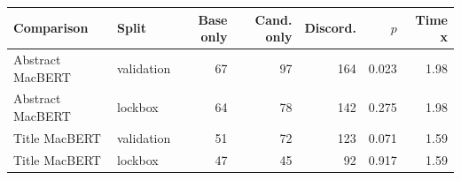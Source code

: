 \small
\setlength{\tabcolsep}{3.5pt}
\begin{tabular}{@{}llrrrrr@{}}
\toprule
Comparison & Split & Base only & Cand. only & Discord. & $p$ & Time x \\
\midrule
Abstract MacBERT & validation & 67 & 97 & 164 & 0.023 & 1.98 \\
Abstract MacBERT & lockbox & 64 & 78 & 142 & 0.275 & 1.98 \\
Title MacBERT & validation & 51 & 72 & 123 & 0.071 & 1.59 \\
Title MacBERT & lockbox & 47 & 45 & 92 & 0.917 & 1.59 \\
\bottomrule
\end{tabular}
